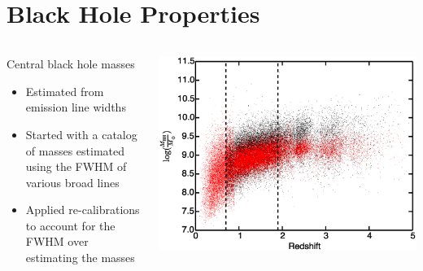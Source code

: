 \documentclass[landscape,9pt]{beamer}
\begin{document}
\section{Black Hole Properties}
\begin{frame}
	\begin{columns}
	\begin{column}{.35\textwidth}
		\begin{block}{Central black hole masses}
		\begin{itemize}
			\item Estimated from emission line widths %
			\item Started with a catalog of masses estimated using the FWHM of various broad lines
			\item Applied re-calibrations to account for the FWHM over estimating the masses
		\end{itemize}
		\end{block}
	\end{column}
	\begin{column}{.75\textwidth}
		\includegraphics[width=\textwidth]{../images/BH/f1}
	\end{column}
	\end{columns}
\end{frame}
\end{document}

